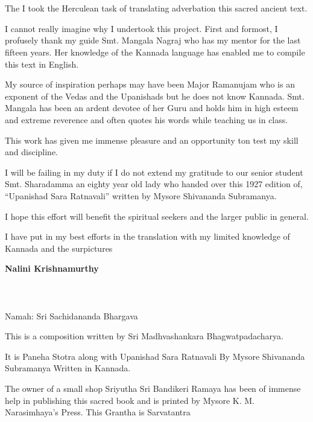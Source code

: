 
\chapter*{}

The I took the Herculean task of translating adverbation this sacred ancient text.

I cannot really imagine why I undertook this project. First and formost, I profusely thank my guide Smt. Mangala Nagraj who has my mentor for the last fifteen years. Her knowledge of the Kannada language has enabled me to compile this text in English.

My source of inspiration perhaps may have been Major Ramanujam who is an exponent of the Vedas and the Upanishads but he does not know Kannada. Smt. Mangala has been an ardent devotee of her Guru and holds him in high esteem and extreme reverence and often quotes his words while teaching us in class.

This work has given me immense pleasure and an opportunity ton test my skill and discipline.

I will be failing in my duty if I do not extend my gratitude to our senior student Smt. Sharadamma an eighty year old lady who handed over this 1927 edition of, “Upanishad Sara Ratnavali” written by Mysore Shivananda Subramanya.

I hope this effort will benefit the spiritual seekers and the larger public in general.

I have put in my best efforts in the translation with my limited knowledge of Kannada and the surpictures

\begin{flushright}
\textbf{Nalini Krishnamurthy}
\end{flushright}

\chapter*{}

\begin{center}
\\ Namah: Sri Sachidananda Bhargava
\end{center}

This is a composition written by Sri Madhvashankara Bhagwatpada\-charya.

It is Paneha Stotra along with Upanishad Sara Ratnavali By Mysore Shivananda Subramanya Written in Kannada.

The owner of a small shop Sriyutha  Sri Bandikeri Ramaya has been of immense help in publishing this sacred book and is printed by Mysore K. M. Narasimhaya's Press. This Grantha is Sarvatantra

